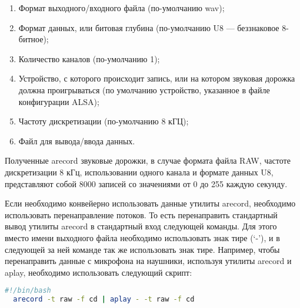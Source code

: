 \begin{enumerate}
  \item Формат выходного/входного файла (по-умолчанию wav);
  \item Формат данных, или битовая глубина (по-умолчанию U8 --- беззнаковое 8-битное);
  \item Количество каналов (по-умолчанию 1);
  \item Устройство, с которого происходит запись, или на котором звуковая дорожка должна проигрываться (по умолчанию устройство, указанное в файле конфигурации ALSA);
  \item Частоту дискретизации (по-умолчанию 8 кГЦ);
  \item Файл для вывода/ввода данных.
\end{enumerate}

Полученные arecord звуковые дорожки, в случае формата файла RAW, частоте дискретизации 8 кГц, использовании одного канала и формате данных U8, представляют собой 8000 записей со значениями от 0 до 255 каждую секунду.

Если необходимо конвейерно использовать данные утилиты arecord, необходимо использовать перенаправление потоков. То есть перенаправить стандартный вывод утилиты arecord в стандартный вход следующей команды. Для этого вместо имени выходного файла необходимо использовать знак тире (`-'), и в следующей за ней команде так же использовать знак тире. Например, чтобы перенаправить данные с микрофона на наушники, используя утилиты arecord и aplay, необходимо использовать следующий скрипт:

\begin{lstlisting}[style=ES6, language=bash]
  #!/bin/bash
  arecord -t raw -f cd | aplay - -t raw -f cd
\end{lstlisting}
